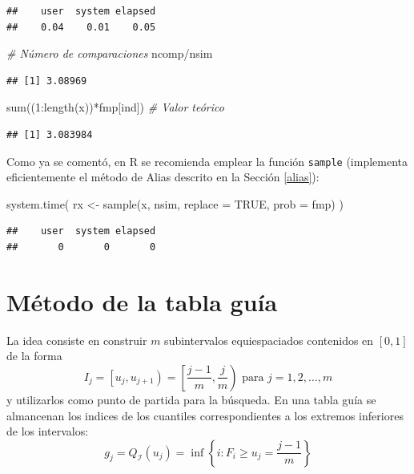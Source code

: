 \documentclass[
]{book}
\newenvironment{Shaded}{\begin{snugshade}}{\end{snugshade}}
\newcommand{\AttributeTok}[1]{\textcolor[rgb]{0.77,0.63,0.00}{#1}}
\newcommand{\CommentTok}[1]{\textcolor[rgb]{0.56,0.35,0.01}{\textit{#1}}}
\newcommand{\ConstantTok}[1]{\textcolor[rgb]{0.00,0.00,0.00}{#1}}
\newcommand{\DecValTok}[1]{\textcolor[rgb]{0.00,0.00,0.81}{#1}}
\newcommand{\FunctionTok}[1]{\textcolor[rgb]{0.00,0.00,0.00}{#1}}
\newcommand{\NormalTok}[1]{#1}
\newcommand{\OtherTok}[1]{\textcolor[rgb]{0.56,0.35,0.01}{#1}}
\newcommand{\SpecialCharTok}[1]{\textcolor[rgb]{0.00,0.00,0.00}{#1}}
\theoremstyle{break}
\theoremstyle{definition}
\theoremstyle{definition}
\theoremstyle{definition}
\theoremstyle{definition}
\theoremstyle{remark}
\begin{document}
\begin{verbatim}
##    user  system elapsed 
##    0.04    0.01    0.05
\end{verbatim}

\begin{Shaded}
\begin{Highlighting}[]
\CommentTok{\# Número de comparaciones}
\NormalTok{ncomp}\SpecialCharTok{/}\NormalTok{nsim}
\end{Highlighting}
\end{Shaded}

\begin{verbatim}
## [1] 3.08969
\end{verbatim}

\begin{Shaded}
\begin{Highlighting}[]
\FunctionTok{sum}\NormalTok{((}\DecValTok{1}\SpecialCharTok{:}\FunctionTok{length}\NormalTok{(x))}\SpecialCharTok{*}\NormalTok{fmp[ind]) }\CommentTok{\# Valor teórico}
\end{Highlighting}
\end{Shaded}

\begin{verbatim}
## [1] 3.083984
\end{verbatim}

Como ya se comentó, en R se recomienda emplear la función \texttt{sample}
(implementa eficientemente el método de Alias descrito en la Sección \ref{alias}):

\begin{Shaded}
\begin{Highlighting}[]
\FunctionTok{system.time}\NormalTok{( rx }\OtherTok{\textless{}{-}} \FunctionTok{sample}\NormalTok{(x, nsim, }\AttributeTok{replace =} \ConstantTok{TRUE}\NormalTok{, }\AttributeTok{prob =}\NormalTok{ fmp) )}
\end{Highlighting}
\end{Shaded}

\begin{verbatim}
##    user  system elapsed 
##       0       0       0
\end{verbatim}

\hypertarget{muxe9todo-de-la-tabla-guuxeda}{%
\section{Método de la tabla guía}\label{muxe9todo-de-la-tabla-guuxeda}}

La idea consiste en construir \(m\) subintervalos equiespaciados
contenidos en \([0,1]\) de la forma
\[I_{j}=\left[ u_{j},u_{j+1}\right) =\left[ \frac{j-1}{m},\frac{j}{m}\right) 
\text{ para }j=1,2,\ldots ,m\]
y utilizarlos como punto de partida para la búsqueda.
En una tabla guía se almancenan los indices de los cuantiles
correspondientes a los extremos inferiores de los intervalos:
\[g_{j}=Q_{\mathcal{I}}(u_{j})=\inf \left\{ i:F_{i}\geq u_{j}=\frac{j-1}{m}\right\}\]
\end{document}
